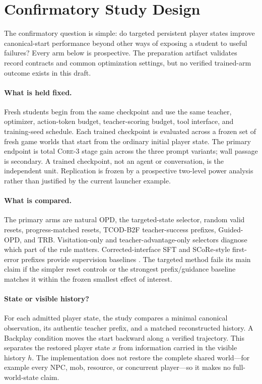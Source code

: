 \documentclass[11pt,a4paper]{article}
\newcommand{\core}{\textsc{Core-3}}
\begin{document}
\section{Confirmatory Study Design}
\label{sec:confirmatory}

The confirmatory question is simple: do targeted persistent player states
improve canonical-start performance beyond other ways of exposing a student to
useful failures? Every arm below is prospective. The preparation artifact
validates record contracts and common optimization settings, but no verified
trained-arm outcome exists in this draft.

\paragraph{What is held fixed.}
Fresh students begin from the same checkpoint and use the same teacher,
optimizer, action-token budget, teacher-scoring budget, tool interface, and
training-seed schedule. Each trained checkpoint is evaluated across a frozen
set of fresh game worlds that start from the ordinary initial player state.
The primary endpoint is total \core{} stage gain across the three prompt
variants; wall passage is secondary. A trained checkpoint, not an agent or
conversation, is the independent unit. Replication is frozen by a prospective
two-level power analysis rather than justified by the current launcher example.

\paragraph{What is compared.}
The primary arms are natural OPD, the targeted-state selector, random valid
resets, progress-matched resets, TCOD-B2F teacher-success prefixes, Guided-OPD, and
TRB. Visitation-only and teacher-advantage-only selectors diagnose which part of
the rule matters. Corrected-interface SFT and SCoRe-style first-error prefixes
provide supervision baselines \citep{lyu2025score}. The targeted method fails
its main claim if the simpler reset controls or the strongest prefix/guidance
baseline matches it within the frozen smallest effect of interest.

\paragraph{State or visible history?}
For each admitted player state, the study compares a minimal canonical
observation, its authentic teacher prefix, and a matched reconstructed history.
A Backplay condition moves the start backward along a verified trajectory.
This separates the restored player state $x$ from information carried in the
visible history $h$. The implementation does not restore the complete shared
world---for example every NPC, mob, resource, or concurrent player---so it
makes no full-world-state claim.
\end{document}

